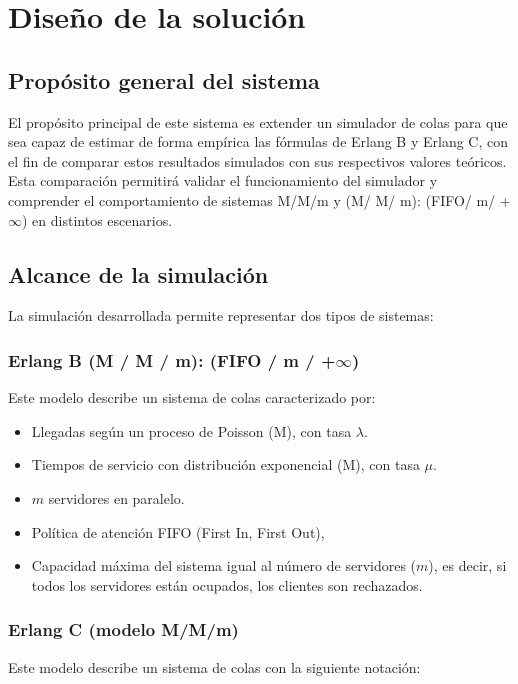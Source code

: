 \documentclass{article}
\begin{document}
\section{Diseño de la solución} \label{sec:disSol}

\subsection*{Propósito general del sistema}

El propósito principal de este sistema es extender un simulador de colas para que sea capaz de estimar de forma empírica las fórmulas de Erlang B y Erlang C, con el fin de comparar estos resultados simulados con sus respectivos valores teóricos. Esta comparación permitirá validar el funcionamiento del simulador y comprender el comportamiento de sistemas M/M/m y (M/ M/ m): (FIFO/ m/ +$\infty$) en distintos escenarios.

\subsection*{Alcance de la simulación}

La simulación desarrollada permite representar dos tipos de sistemas:
\subsubsection*{Erlang B (M / M / m): (FIFO / m / +$\infty$)}

Este modelo describe un sistema de colas caracterizado por:
\begin{itemize}
    \item Llegadas según un proceso de Poisson (M), con tasa $\lambda$.
    \item Tiempos de servicio con distribución exponencial (M), con tasa $\mu$.
    \item $m$ servidores en paralelo.
    \item Política de atención FIFO (First In, First Out), 
    \item Capacidad máxima del sistema igual al número de servidores ($m$), es decir, si todos los servidores están ocupados, los clientes son rechazados.
\end{itemize}

\subsubsection*{Erlang C (modelo M/M/m)}

Este modelo describe un sistema de colas con la siguiente notación:
\end{document}
